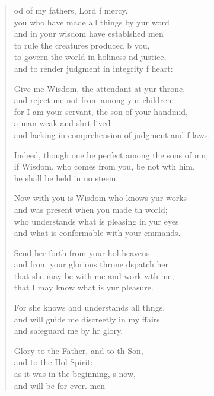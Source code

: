 \settowidth{\versewidth}{Indeed, though one be perfect among the sons of men, +}
\begin{verse}%
  \begin{patverse}
od of my fathers, Lord f mercy,\Med\\
you who have made all things by yur word\\
and in your wisdom have establ\pointup{\i}shed men\Med\\
to rule the creatures produced b you,\\
to govern the world in holiness nd justice,\Med\\
and to render judgment in integrity f heart:

Give me Wisdom, the attendant at yur throne,\Med\\
and reject me not from among yur children:\\
for I am your servant, the son of your handmid,\Flex\\
a man weak and shrt-lived\Med\\
and lacking in comprehension of judgment and f laws.

Indeed, though one be perfect among the sons of mn,\Flex\\
if Wisdom, who comes from you, be not w\pointup{\i}th him,\Med\\
he shall be held in no steem.

Now with you is Wisdom who knows yur works\Med\\
and was present when you made th world;\\
who understands what is pleasing in yur eyes\Med\\
and what is conformable with your cmmands.

Send her forth from your hol heavens\Med\\
and from your glorious throne d\pointup{\i}spatch her\\
that she may be with me and work w\pointup{\i}th me,\Med\\
that I may know what is yur pleasure.

For she knows and understands all th\pointup{\i}ngs,\Flex\\
and will guide me discreetly in my ffairs\Med\\
and safeguard me by hr glory.

Glory to the Father, and to th Son,\Med\\
and to the Hol Spirit:\\
as it was in the beginning, \pointup{\i}s now,\Med\\
and will be for ever. men
  \end{patverse}
\end{verse}
